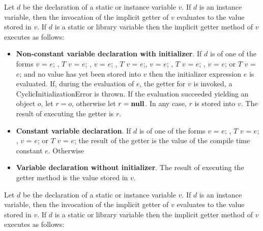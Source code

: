 \documentclass{article}
\newcommand{\code}[1]{{\sf #1}}
\begin{document}
\LMHash{}
Let $d$ be the declaration of a static or instance variable $v$.  If $d$ is an instance variable, then the invocation of the implicit getter  of $v$ evaluates to the value stored in $v$.
If $d$ is a static or library variable then the implicit getter method of $v$ executes as follows:
\begin{itemize}
\item {\bf Non-constant variable declaration with initializer}. If $d$
is of one of the forms \code{\VAR{} $v$ = $e$;} ,  \code{$T$ $v$ = $e$;} ,
\code{\FINAL{} $v$ = $e$;} ,  \code{\FINAL{} $T$ $v$ = $e$;},
\code{\STATIC{} $v$ = $e$; }, \code{\STATIC{} $T$ $v$ = $e$; },
\code{\STATIC{} \FINAL{} $v$ = $e$; } or
\code{\STATIC{} \FINAL{} $T$ $v$ = $e$;} and no value has yet been stored
into $v$ then the initializer expression $e$ is evaluated. If, during
the evaluation of $e$, the getter for $v$ is invoked, a
\code{CyclicInitializationError} is thrown. If the evaluation succeeded
yielding an object $o$, let $r = o$, otherwise let $r = \textbf{null}{}$. In
any case, $r$ is stored into $v$. The result of executing the getter
is $r$.
\item  {\bf Constant variable declaration}. If $d$ is of one of the
    forms \code{\CONST{} $v$ = $e$; } ,  \code{\CONST{} $T$  $v$ = $e$; },
    \code{\STATIC{} \CONST{} $v$ = $e$; } or
    \code{\STATIC{} \CONST{} $T$ $v$ = $e$;} the result of the getter is the
    value of the compile time constant $e$.
    Otherwise
\item {\bf Variable declaration without initializer}. The result of
    executing the getter method is the value stored in $v$.
\end{itemize}

\LMHash{}
Let $d$ be the declaration of a static or instance%
variable $v$.  If $d$ is an instance variable, then the %
invocation of the implicit getter  of $v$ evaluates to%
                   the value stored in $v$.
If $d$ is a static or library variable then the implicit %
getter method of $v$ executes as follows: %
\end{document}
